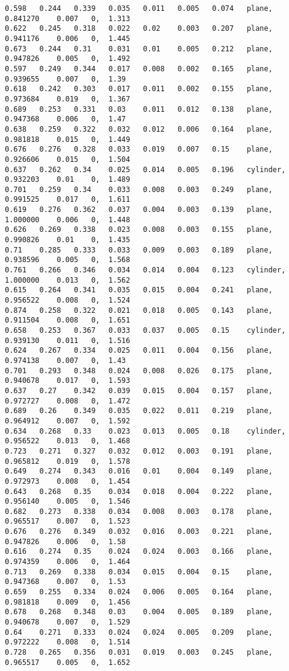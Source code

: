 {\fontsize{7.5}{10} \selectfont
	\label{code:planoAE}
	\begin{lstlisting}[caption={Datos obtenidos para la prueba del plano usando AE.}]
0.598	0.244	0.339	0.035	0.011	0.005	0.074	plane,  	0.841270	0.007	0, 	1.313
0.622	0.245	0.318	0.022	0.02	0.003	0.207	plane,  	0.941176	0.006	0, 	1.445
0.673	0.244	0.31	0.031	0.01	0.005	0.212	plane,  	0.947826	0.005	0, 	1.492
0.597	0.249	0.344	0.017	0.008	0.002	0.165	plane,  	0.939655	0.007	0, 	1.39
0.618	0.242	0.303	0.017	0.011	0.002	0.155	plane,  	0.973684	0.019	0, 	1.367
0.689	0.253	0.331	0.03	0.011	0.012	0.138	plane,  	0.947368	0.006	0, 	1.47
0.638	0.259	0.322	0.032	0.012	0.006	0.164	plane,  	0.981818	0.015	0, 	1.449
0.676	0.276	0.328	0.033	0.019	0.007	0.15	plane,  	0.926606	0.015	0, 	1.504
0.637	0.262	0.34	0.025	0.014	0.005	0.196	cylinder, 	0.932203	0.01	0, 	1.489
0.701	0.259	0.34	0.033	0.008	0.003	0.249	plane,  	0.991525	0.017	0, 	1.611
0.619	0.276	0.362	0.037	0.004	0.003	0.139	plane,  	1.000000	0.006	0, 	1.448
0.626	0.269	0.338	0.023	0.008	0.003	0.155	plane,  	0.990826	0.01	0, 	1.435
0.71	0.285	0.333	0.033	0.009	0.003	0.189	plane,  	0.938596	0.005	0, 	1.568
0.761	0.266	0.346	0.034	0.014	0.004	0.123	cylinder,  	1.000000	0.013	0, 	1.562
0.615	0.264	0.341	0.035	0.015	0.004	0.241	plane,  	0.956522	0.008	0, 	1.524
0.874	0.258	0.322	0.021	0.018	0.005	0.143	plane,  	0.911504	0.008	0, 	1.651
0.658	0.253	0.367	0.033	0.037	0.005	0.15	cylinder, 	0.939130	0.011	0, 	1.516
0.624	0.267	0.334	0.025	0.011	0.004	0.156	plane,  	0.974138	0.007	0, 	1.43
0.701	0.293	0.348	0.024	0.008	0.026	0.175	plane,  	0.940678	0.017	0, 	1.593
0.637	0.27	0.342	0.039	0.015	0.004	0.157	plane,  	0.972727	0.008	0, 	1.472
0.689	0.26	0.349	0.035	0.022	0.011	0.219	plane,  	0.964912	0.007	0, 	1.592
0.634	0.268	0.33	0.023	0.013	0.005	0.18	cylinder, 	0.956522	0.013	0, 	1.468
0.723	0.271	0.327	0.032	0.012	0.003	0.191	plane,  	0.965812	0.019	0, 	1.578
0.649	0.274	0.343	0.016	0.01	0.004	0.149	plane,  	0.972973	0.008	0, 	1.454
0.643	0.268	0.35	0.034	0.018	0.004	0.222	plane,  	0.956140	0.005	0, 	1.546
0.682	0.273	0.338	0.034	0.008	0.003	0.178	plane,  	0.965517	0.007	0, 	1.523
0.676	0.276	0.349	0.032	0.016	0.003	0.221	plane,  	0.947826	0.006	0, 	1.58
0.616	0.274	0.35	0.024	0.024	0.003	0.166	plane,  	0.974359	0.006	0, 	1.464
0.713	0.269	0.338	0.034	0.015	0.004	0.15	plane,  	0.947368	0.007	0, 	1.53
0.659	0.255	0.334	0.024	0.006	0.005	0.164	plane,  	0.981818	0.009	0, 	1.456
0.678	0.268	0.348	0.03	0.004	0.005	0.189	plane,  	0.940678	0.007	0, 	1.529
0.64	0.271	0.333	0.024	0.024	0.005	0.209	plane,  	0.972222	0.008	0, 	1.514
0.728	0.265	0.356	0.031	0.019	0.003	0.245	plane,  	0.965517	0.005	0, 	1.652

\end{lstlisting}}
